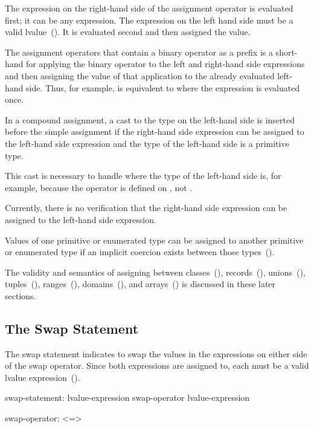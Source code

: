 The expression on the right-hand side of the assignment operator is
evaluated first; it can be any expression.  The expression on the left
hand side must be a valid lvalue~().  It is evaluated
second and then assigned the value.

The assignment operators that contain a binary operator as a prefix is
a short-hand for applying the binary operator to the left and
right-hand side expressions and then assigning the value of that
application to the already evaluated left-hand side.  Thus, for
example,  is equivalent to  where the
expression  is evaluated once.

In a compound assignment, a cast to the type on the left-hand side is
inserted before the simple assignment if the right-hand side
expression can be assigned to the left-hand side expression and the
type of the left-hand side is a primitive type.

\begin{rationale}
This cast is necessary to handle \chpl{+=} where the type of the
left-hand side is, for example,  because the \chpl{+}
operator is defined on , not .
\end{rationale}

\begin{status}
Currently, there is no verification that the right-hand side
expression can be assigned to the left-hand side expression.
\end{status}

Values of one primitive or enumerated type can be assigned to another
primitive or enumerated type if an implicit coercion exists between
those types~().

The validity and semantics of assigning between
classes~(), records~(),
unions~(), tuples~(),
ranges~(),
domains~(), and arrays~()
is discussed in these later sections.

\subsection{The Swap Statement}
\label{The_Swap_Statement}
The swap statement indicates to swap the values in the expressions
on either side of the swap operator.  Since both expressions are assigned
to, each must be a valid lvalue expression~().
\begin{syntax}
swap-statement:
  lvalue-expression swap-operator lvalue-expression

swap-operator:
  <=>
\end{syntax}

